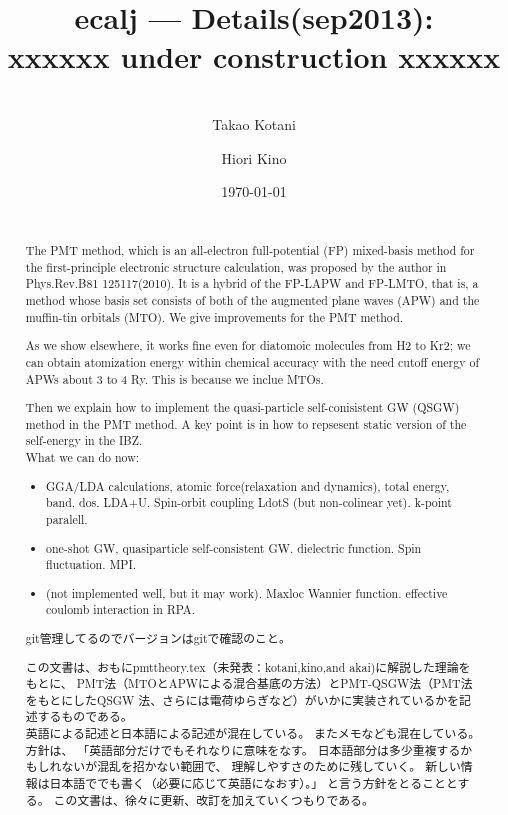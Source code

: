 \documentclass[a4paper,10pt,aip,onecolumn,amsmath,amssymb,floatfix,rmp]{revtex4-1}
\begin{document}

\title{\Large ecalj --- Details(sep2013): \\ xxxxxx under construction xxxxxx}
\author{\large \ \\ Takao Kotani}
\author{\large Hiori Kino}
\date{\today}
\vspace{1cm}
\begin{abstract}
\ \\ The PMT method, which is an all-electron full-potential (FP) mixed-basis
method for the first-principle electronic structure calculation, was proposed 
by the author in Phys.Rev.B81 125117(2010). 
It is a hybrid of the FP-LAPW and FP-LMTO, that is, a method 
whose basis set consists of both of the augmented plane waves (APW) 
and the muffin-tin orbitals (MTO). We give improvements for the PMT
method. 

 As we show elsewhere, it works fine even for diatomoic molecules
from H2 to Kr2; we can obtain atomization energy within chemical
accuracy with the need cutoff energy of APWs about 3 to 4 Ry. This is
because we inclue MTOs.

Then we explain how to implement the quasi-particle
self-conisistent GW (QSGW) method in the PMT method.
A key point is in how to repsesent static version of the self-energy 
in the IBZ.\\

What we can do now:
\begin{itemize}
\item GGA/LDA calculations, atomic force(relaxation and dynamics), total
      energy, band, dos. LDA+U. Spin-orbit coupling LdotS (but
      non-colinear yet). k-point paralell.
\item one-shot GW, quasiparticle self-consistent GW. dielectric function. Spin
      fluctuation. MPI.
\item (not implemented well, but it may work). Maxloc Wannier function.
      effective coulomb interaction in RPA.
\end{itemize}

git管理してるのでバージョンはgitで確認のこと。

この文書は、おもにpmttheory.tex（未発表：kotani,kino,and akai)に解説した理論をもとに、
PMT法（MTOとAPWによる混合基底の方法）とPMT-QSGW法（PMT法をもとにしたQSGW
法、さらには電荷ゆらぎなど）がいかに実装されているかを記述するものである。\\

英語による記述と日本語による記述が混在している。
またメモなども混在している。方針は、
「英語部分だけでもそれなりに意味をなす。
日本語部分は多少重複するかもしれないが混乱を招かない範囲で、
理解しやすさのために残していく。
新しい情報は日本語ででも書く（必要に応じて英語になおす）。」
と言う方針をとることとする。
この文書は、徐々に更新、改訂を加えていくつもりである。
\end{abstract}
\end{document}
